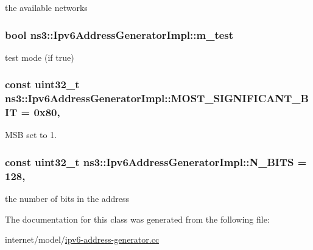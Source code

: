 the available networks 

\subsubsection[{\texorpdfstring{m\+\_\+test}{m_test}}]{\setlength{\rightskip}{0pt plus 5cm}bool ns3\+::\+Ipv6\+Address\+Generator\+Impl\+::m\+\_\+test\hspace{0.3cm}{\ttfamily [private]}}\hypertarget{classns3_1_1Ipv6AddressGeneratorImpl_a6538e5a709f4060466c5253a0289cdf8}{}\label{classns3_1_1Ipv6AddressGeneratorImpl_a6538e5a709f4060466c5253a0289cdf8}


test mode (if true) 

\subsubsection[{\texorpdfstring{M\+O\+S\+T\+\_\+\+S\+I\+G\+N\+I\+F\+I\+C\+A\+N\+T\+\_\+\+B\+IT}{MOST_SIGNIFICANT_BIT}}]{\setlength{\rightskip}{0pt plus 5cm}const uint32\+\_\+t ns3\+::\+Ipv6\+Address\+Generator\+Impl\+::\+M\+O\+S\+T\+\_\+\+S\+I\+G\+N\+I\+F\+I\+C\+A\+N\+T\+\_\+\+B\+IT = 0x80\hspace{0.3cm}{\ttfamily [static]}, {\ttfamily [private]}}\hypertarget{classns3_1_1Ipv6AddressGeneratorImpl_a14a3d1c913a0273ff123b95ee8d36a3c}{}\label{classns3_1_1Ipv6AddressGeneratorImpl_a14a3d1c913a0273ff123b95ee8d36a3c}


M\+SB set to 1. 

\subsubsection[{\texorpdfstring{N\+\_\+\+B\+I\+TS}{N_BITS}}]{\setlength{\rightskip}{0pt plus 5cm}const uint32\+\_\+t ns3\+::\+Ipv6\+Address\+Generator\+Impl\+::\+N\+\_\+\+B\+I\+TS = 128\hspace{0.3cm}{\ttfamily [static]}, {\ttfamily [private]}}\hypertarget{classns3_1_1Ipv6AddressGeneratorImpl_abe99ce1055f3a7de9263da1d34ef2629}{}\label{classns3_1_1Ipv6AddressGeneratorImpl_abe99ce1055f3a7de9263da1d34ef2629}


the number of bits in the address 



The documentation for this class was generated from the following file\+:\begin{DoxyCompactItemize}
\item 
internet/model/\hyperlink{ipv6-address-generator_8cc}{ipv6-\/address-\/generator.\+cc}\end{DoxyCompactItemize}
